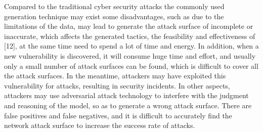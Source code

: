 \documentclass[runningheads]{llncs}
\begin{document}
Compared to the traditional cyber security attacks the commonly used generation technique may exist some disadvantages, such as due to the limitations of the data, may lead to generate the attack surface of incomplete or inaccurate, which affects the generated tactics, the feasibility and effectiveness of [12], at the same time need to spend a lot of time and energy. In addition, when a new vulnerability is discovered, it will consume huge time and effort, and usually only a small number of attack surfaces can be found, which is difficult to cover all the attack surfaces. In the meantime, attackers may have exploited this vulnerability for attacks, resulting in security incidents. In other aspects, attackers may use adversarial attack technology to interfere with the judgment and reasoning of the model, so as to generate a wrong attack surface. There are false positives and false negatives, and it is difficult to accurately find the network attack surface to increase the success rate of attacks.\par
%
\end{document}
